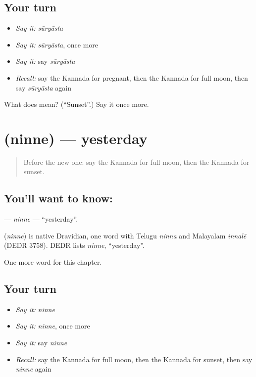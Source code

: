 \subsection*{Your turn}
\begin{itemize}
\raggedright
  \item \emph{Say it:} \emph{sūryāsta}
  \item \emph{Say it:} \emph{sūryāsta}, once more
  \item \emph{Say it:} say \emph{sūryāsta}
  \item \emph{Recall:} say the Kannada for pregnant, then the Kannada for full moon, then say \emph{sūryāsta} again
\end{itemize}

\begin{tcolorbox}[breakable,colback=teal!4,colframe=teal!35!black,title={Before you move on}]
What does  mean? (\textquotedblleft{}Sunset\textquotedblright{}.) Say it once more.
\end{tcolorbox}
\section[\texorpdfstring{\kn{ನಿನ್ನೆ} (ninne)}{ನಿನ್ನೆ (ninne)}]{ (ninne) — yesterday}

\label{lesson:KA-C284-ninne}



\begin{quote}
Before the new one: say the Kannada for full moon, then the Kannada for sunset.
\end{quote}

\subsection*{You'll want to know: }
\textbf{} — \emph{ninne} — \textquotedblleft{}yesterday\textquotedblright{}.

\begin{cousinweb}
\textbf{} (\emph{ninne}) is native Dravidian, one word with Telugu \emph{ninna} and Malayalam \emph{innalē} (DEDR 3758). DEDR lists \emph{ninne}, \textquotedblleft{}yesterday\textquotedblright{}.
\end{cousinweb}

\begin{grammarlens}[title={What you've built}]
One more word for this chapter.
\end{grammarlens}

\subsection*{Your turn}
\begin{itemize}
\raggedright
  \item \emph{Say it:} \emph{ninne}
  \item \emph{Say it:} \emph{ninne}, once more
  \item \emph{Say it:} say \emph{ninne}
  \item \emph{Recall:} say the Kannada for full moon, then the Kannada for sunset, then say \emph{ninne} again
\end{itemize}

